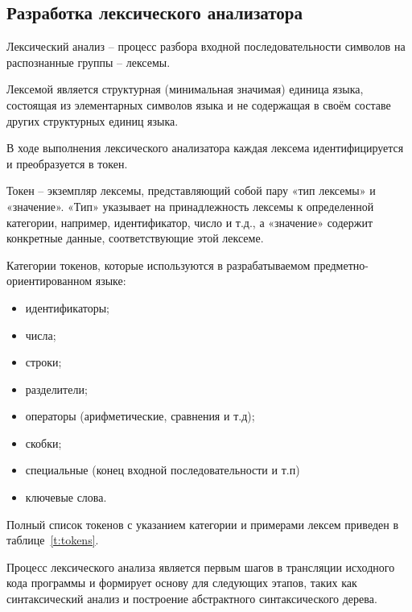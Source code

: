 \subsection{Разработка лексического анализатора}


Лексический анализ – процесс разбора входной последовательности символов на распознанные группы – лексемы.

Лексемой является структурная (минимальная значимая) единица языка, состоящая из элементарных символов языка и не содержащая в своём составе других структурных единиц языка.

В ходе выполнения лексического анализатора каждая лексема идентифицируется и преобразуется в токен.

Токен – экземпляр лексемы, представляющий собой пару «тип лексемы» и «значение».
«Тип» указывает на принадлежность лексемы к определенной категории, например, идентификатор, число и т.д., а «значение» содержит конкретные данные, соответствующие этой лексеме.

Категории токенов, которые используются в разрабатываемом предметно-ориентированном языке:
\begin{itemize}
    \item идентификаторы;
    \item числа;
    \item строки;
    \item разделители;
    \item операторы (арифметические, сравнения и т.д);
    \item скобки;
    \item специальные (конец входной последовательности и т.п)
    \item ключевые слова.
\end{itemize}

Полный список токенов с указанием категории и примерами лексем приведен в таблице~\ref{t:tokens}.

Процесс лексического анализа является первым шагов в трансляции исходного кода программы и формирует основу для следующих этапов,
таких как синтаксический анализ и построение абстрактного синтаксического дерева.

\clearpage

